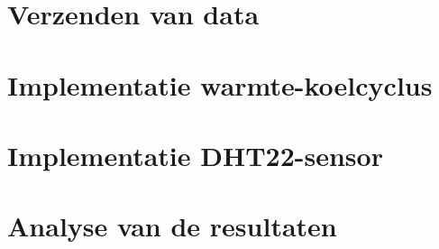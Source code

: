 \section{Verzenden van data}%
\label{sec:verzendendata}

\section{Implementatie warmte-koelcyclus}%
\label{sec:warmte_koel}

\section{Implementatie DHT22-sensor}%
\label{sec:dht22}

\section{Analyse van de resultaten}%
\label{sec:analysis}

